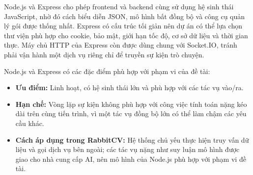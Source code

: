 Node.js và Express cho phép frontend và backend cùng sử dụng hệ sinh thái JavaScript, nhờ đó cách biểu diễn JSON, mô hình bất đồng bộ và công cụ quản lý gói được thống nhất. Express có cấu trúc tối giản nên dự án có thể lựa chọn thư viện phù hợp cho cookie, bảo mật, giới hạn tốc độ, cơ sở dữ liệu và thời gian thực. Máy chủ HTTP của Express còn được dùng chung với Socket.IO, tránh phải vận hành một dịch vụ riêng chỉ để truyền sự kiện trò chuyện.

Node.js và Express có các đặc điểm phù hợp với phạm vi của đề tài:

\begin{itemize}
    \item \textbf{Ưu điểm:} Linh hoạt, có hệ sinh thái lớn và phù hợp với các tác vụ vào/ra.
    \item \textbf{Hạn chế:} Vòng lặp sự kiện không phù hợp với công việc tính toán nặng kéo dài trên cùng tiến trình, vì một tác vụ đồng bộ lớn có thể làm chậm các yêu cầu khác.
    \item \textbf{Cách áp dụng trong RabbitCV:} Hệ thống chủ yếu thực hiện truy vấn dữ liệu và gọi dịch vụ bên ngoài; các tác vụ nặng như suy luận mô hình được giao cho nhà cung cấp AI, nên mô hình của Node.js phù hợp với phạm vi đề tài.
\end{itemize}




